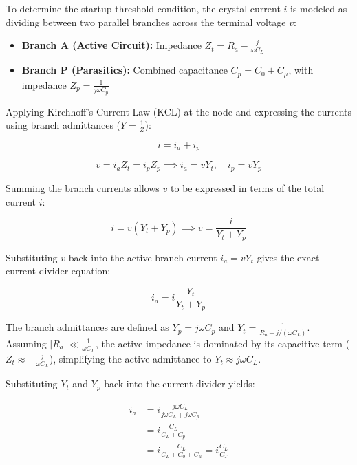 To determine the startup threshold condition, the crystal current $i$ is modeled as dividing between two parallel branches across the terminal voltage $v$:

\begin{itemize}
	\item \textbf{Branch A (Active Circuit):} Impedance $Z_t = R_a - \frac{j}{\omega C_L}$
	\item \textbf{Branch P (Parasitics):} Combined capacitance $C_p = C_0 + C_\mu$, with impedance $Z_p = \frac{1}{j\omega C_p}$
\end{itemize}

Applying Kirchhoff's Current Law (KCL) at the node and expressing the currents using branch admittances ($Y = \frac{1}{Z}$):

\begin{equation}
	i = i_a + i_p
\end{equation}

\begin{equation}
	v = i_a Z_t = i_p Z_p \implies i_a = v Y_t, \quad i_p = v Y_p
\end{equation}

Summing the branch currents allows $v$ to be expressed in terms of the total current $i$:

\begin{equation}
	i = v(Y_t + Y_p) \implies v = \frac{i}{Y_t + Y_p}
\end{equation}

Substituting $v$ back into the active branch current $i_a = v Y_t$ gives the exact current divider equation:

\begin{equation}
	i_a = i \frac{Y_t}{Y_t + Y_p}
\end{equation}

The branch admittances are defined as $Y_p = j\omega C_p$ and $Y_t = \frac{1}{R_a - j/(\omega C_L)}$. Assuming $|R_a| \ll \frac{1}{\omega C_L}$, the active impedance is dominated by its capacitive term ($Z_t \approx -\frac{j}{\omega C_L}$), simplifying the active admittance to $Y_t \approx j\omega C_L$.

Substituting $Y_t$ and $Y_p$ back into the current divider yields:

\begin{align}
	i_a &= i \frac{j\omega C_L}{j\omega C_L + j\omega C_p} \nonumber \\
	&= i \frac{C_L}{C_L + C_p} \nonumber \\
	&= i \frac{C_L}{C_L + C_0 + C_\mu} = i \frac{C_L}{C_T}
\end{align}

